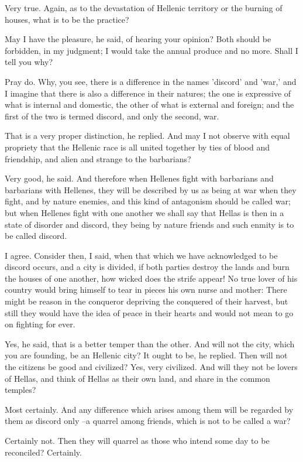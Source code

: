 Very true.
Again, as to the devastation of Hellenic territory or the burning of houses, what is to be the practice?

May I have the pleasure, he said, of hearing your opinion?
Both should be forbidden, in my judgment; I would take the annual produce and no more. Shall I tell you why?

Pray do.
Why, you see, there is a difference in the names 'discord' and 'war,' and I imagine that there is also a difference in their natures; the one is expressive of what is internal and domestic, the other of what is external and foreign; and the first of the two is termed discord, and only the second, war.

That is a very proper distinction, he replied.
And may I not observe with equal propriety that the Hellenic race is all united together by ties of blood and friendship, and alien and strange to the barbarians?

Very good, he said.
And therefore when Hellenes fight with barbarians and barbarians with Hellenes, they will be described by us as being at war when they fight, and by nature enemies, and this kind of antagonism should be called war; but when Hellenes fight with one another we shall say that Hellas is then in a state of disorder and discord, they being by nature friends and such enmity is to be called discord.

I agree.
Consider then, I said, when that which we have acknowledged to be discord occurs, and a city is divided, if both parties destroy the lands and burn the houses of one another, how wicked does the strife appear! No true lover of his country would bring himself to tear in pieces his own nurse and mother: There might be reason in the conqueror depriving the conquered of their harvest, but still they would have the idea of peace in their hearts and would not mean to go on fighting for ever.

Yes, he said, that is a better temper than the other.
And will not the city, which you are founding, be an Hellenic city?
It ought to be, he replied.
Then will not the citizens be good and civilized?
Yes, very civilized.
And will they not be lovers of Hellas, and think of Hellas as their own land, and share in the common temples?

Most certainly.
And any difference which arises among them will be regarded by them as discord only --a quarrel among friends, which is not to be called a war?

Certainly not.
Then they will quarrel as those who intend some day to be reconciled? Certainly.

